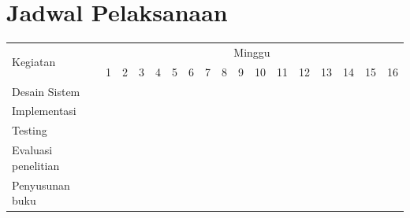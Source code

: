 \section{Jadwal Pelaksanaan}

\newcommand{\w}{}
\newcommand{\G}{\cellcolor{gray}}
\begin{table}[h!]
  \label{tbl:timeline}
  \begin{tabular}{|p{3.5cm}|c|c|c|c|c|c|c|c|c|c|c|c|c|c|c|c|}

    \hline
    \multirow{2}{*}{Kegiatan} & \multicolumn{16}{|c|}{Minggu}                                                                       \\
    \cline{2-17}              &
    1                         & 2                             & 3  & 4  & 5  & 6  & 7  & 8  & 9  & 10 & 11 & 12 & 13 & 14 & 15 & 16 \\
    \hline

    Desain Sistem             &
    \G                        & \G                            & \G & \G & \w & \w & \w & \w & \w & \w & \w & \w & \w & \w & \w & \w \\
    \hline

    Implementasi              &
    \w                        & \w                            & \G & \G & \G & \G & \G & \G & \G & \G & \G & \G & \w & \w & \w & \w \\
    \hline

    Testing                   &
    \w                        & \w                            & \w & \w & \w & \w & \w & \w & \w & \w & \G & \G & \G & \w & \w & \w \\
    \hline

    Evaluasi penelitian       &
    \w                        & \w                            & \w & \w & \w & \w & \w & \w & \w & \w & \w & \w & \G & \G & \G & \G \\
    \hline

    Penyusunan buku           &
    \w                        & \w                            & \w & \w & \w & \G & \G & \G & \G & \G & \G & \G & \G & \G & \G & \G \\
    \hline
  \end{tabular}
\end{table}
